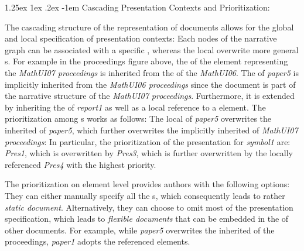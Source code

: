 \documentclass[pdftex,bibtotocnumbered,idxtotoc,11pt]{scrartcl}
\makeatletter
\renewcommand\paragraph{\@startsection{paragraph}{4}{\z@}%
{1.25ex \@plus1ex \@minus.2ex}%
{-1em}%
{\setlength{\parfillskip}{\z@ \@plus 1fil}%
\raggedsection\normalfont\sectfont\nobreak
\size@paragraph\nobreak}}
\makeatother
\begin{document}
\paragraph{Cascading Presentation Contexts and Prioritization:}

The cascading structure of the {\omdoc} representation of documents allows for the global
and local specification of presentation contexts: Each nodes of the narrative graph can be
associated with a specific {}, whereas the local {}
overwrite more general {}s. For example in the proceedings figure above,
the {} of the {} element representing the {\emph{MathUI07
    proceedings}} is inherited from the {} of the {\emph{MathUI06}}. The
{} of {\emph{paper5}} is implicitly inherited from the {\emph{MathUI06
    proceedings}} since the document is part of the narrative structure of the
{\emph{MathUI07 proceedings}}. Furthermore, it is extended by inheriting the
{} of {\emph{report1}} as well as a local reference to a
{} element. The prioritization among {}s works as
follows: The local {} of {\emph{paper5}} overwrites the inherited
{} of {\emph{paper5}}, which further overwrites the implicitly inherited
{} of {\emph{MathUI07 proceedings}}: In particular, the prioritization
of the presentation for {\emph{symbol1}} are: {\emph{Pres1}}, which is overwritten by
{\emph{Pres3}}, which is further overwritten by the locally referenced {\emph{Pres4}} with
the highest priority.

The prioritization on {} element level provides authors with the following
options: They can either manually specify all the {}s, which
consequently leads to rather {\emph{static document}}. Alternatively, they can choose to
omit most of the presentation specification, which leads to {\emph{flexible documents}}
that can be embedded in the {} of other documents. For example, while
{\emph{paper5}} overwrites the inherited {} of the proceedings,
{\emph{paper1}} adopts the referenced {} elements.
\end{document}
